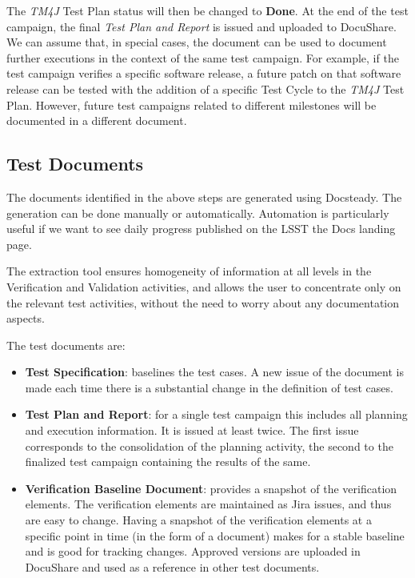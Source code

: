 The \textit{TM4J} Test Plan status will then be changed to \textbf{Done}.
At the end of the test campaign, the  final \textit{Test Plan and Report} is issued and uploaded to DocuShare.
We can assume that, in special cases, the document can be used to document further executions in the context of the same test campaign.
For example, if the test campaign verifies a specific software release, a future patch on that software release can be tested
with the addition of a specific Test Cycle to the \textit{TM4J} Test Plan.
However, future test campaigns related to different milestones will be documented in a different document.

\subsection{Test Documents}

The documents identified in the above steps are generated using Docsteady.
The generation can be done manually or automatically.
Automation is particularly useful if we want to see daily progress published on the LSST the Docs landing page.

The extraction tool ensures homogeneity of information at all levels in the Verification and Validation activities,
and allows the user to concentrate only on the relevant test activities, without the need to worry about any documentation aspects.

The test documents are:

\begin{itemize}
\item \textbf{Test Specification}:  baselines the test cases.
A new issue of the document is made each time there is a substantial change in the definition of test cases.
\item \textbf{Test Plan and Report}:  for a single test campaign this includes all planning and execution information.
It is issued at least twice. The first issue corresponds to the consolidation of the planning activity,
the second to the finalized test campaign containing the results of the same.
\item \textbf{Verification Baseline Document}: provides a snapshot of the verification elements.
The verification elements are  maintained as Jira issues, and  thus are easy to change.
Having a snapshot of the verification elements at a specific point in time  (in the form of a document) makes
for a stable baseline and is good for tracking changes.
Approved versions are uploaded in DocuShare and used as a reference in other test documents.
\end{itemize}

